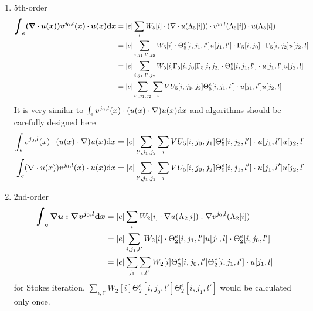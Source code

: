 \begin{enumerate}
  \item $5$th-order
    \begin{equation}\label{eq:integral-guvu}
      \begin{split}
        \bm{\int_e(\nabla\cdot u(x))v^{j_0,l}(x)\cdot u(x)\mathrm{d} x}
        &= |e|\sum_i W_5[i]\cdot (\nabla\cdot u(\Lambda_5[i]))\cdot 
        v^{j_0,l}(\Lambda_5[i]) \cdot u(\Lambda_5[i]) \\
        &= |e|\sum_{i,j_1,l',j_2} W_5[i]\cdot \Theta_5^e[i,j_1,l'] u[j_1,l'] 
        \cdot \Gamma_5[i,j_0] \cdot \Gamma_5[i,j_2]u[j_2,l] \\
        &= |e|\sum_{i,j_1,l',j_2} W_5[i]\Gamma_5[i,j_0]\Gamma_5[i,j_2]
        \cdot\Theta_5^e[i,j_1,l']\cdot u[j_1,l']u[j_2,l] \\
        &= |e|\sum_{l',j_1,j_2}\sum_i VU_5[i,j_0,j_2]\Theta_5^e[i,j_1,l']
        \cdot u[j_1,l']u[j_2,l] 
      \end{split}
    \end{equation}
    It is very similar to $\int_{e}v^{j_0,l}(x)\cdot(u(x)\cdot\nabla)u(x)\mathrm{d} x$ and algorithms should be carefully designed here
    \begin{equation}\label{eq:integral-compare-vugu-guvu}
      \begin{split}
        \int_e v^{j_0,l}(x)\cdot(u(x)\cdot\nabla)u(x)\mathrm{d} x
        &= |e|\sum_{l',j_1,j_2}\sum_iVU_5[i,j_0,j_1]\Theta_5^e[i,j_2,l']\cdot 
        u[j_1,l']u[j_2,l] \\
        \int_e(\nabla\cdot u(x))v^{j_0,l}(x)\cdot u(x)\mathrm{d} x
        &= |e|\sum_{l',j_1,j_2}\sum_i VU_5[i,j_0,j_2]\Theta_5^e[i,j_1,l']
        \cdot u[j_1,l']u[j_2,l] 
      \end{split}
    \end{equation}

  \item $2$nd-order
    \begin{equation}\label{eq:integral-gugv}
      \begin{split}
        \bm{\int_e \nabla u:\nabla v^{j_0,l}\mathrm{d} x} &= |e| \sum_i W_2[i]\cdot 
        \nabla u(\Lambda_2[i]) : \nabla v^{j_0,l}(\Lambda_2[i]) \\
        &= |e| \sum_{i,j_1,l'} W_2[i]\cdot 
        \Theta_2^e[i,j_1,l']u[j_1,l] \cdot \Theta_2^e[i,j_0,l'] \\
        &= |e| \sum_{j_1} \sum_{i,l'}W_2[i]\Theta_2^e[i,j_0,l']\Theta_2^e[i,j_1,l'] 
        \cdot u[j_1,l]
      \end{split}
    \end{equation}
    for Stokes iteration, $\sum_{i,l'}W_2[i]\Theta_2^e[i,j_0,l']\Theta_2^e[i,j_1,l']$
    would be calculated only once.


\end{enumerate}
